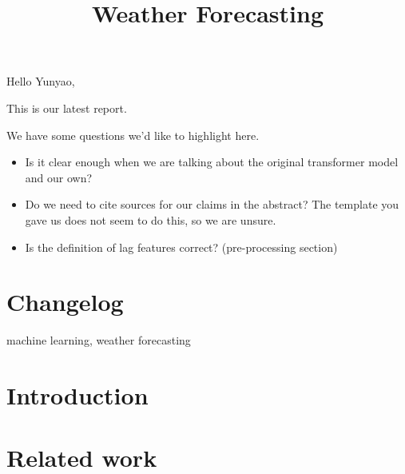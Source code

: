 



Hello Yunyao,

This is our latest report.

We have some questions we'd like to highlight here.

\begin{itemize}
    \item Is it clear enough when we are talking about the original transformer model and our own? 
    \item Do we need to cite sources for our claims in the abstract? The template you gave us does not seem to do this, so we are unsure.
    \item Is the definition of lag features correct? (pre-processing section)
\end{itemize}

\section{Changelog}




\newpage

\title{Weather Forecasting}
\author{
    \and
    \and
    \and
}


\maketitle

\begin{abstract}

\end{abstract}

\begin{IEEEkeywords}
machine learning, weather forecasting
\end{IEEEkeywords}

\section{Introduction}


\section{Related work}\label{sec:relatedwork}




